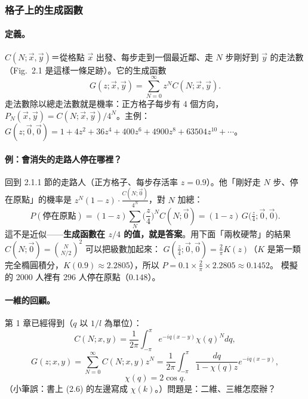 \subsubsection{格子上的生成函數}

\paragraph{定義。}
$C(N;\vec x,\vec y)$＝從格點 $\vec x$ 出發、每步走到一個最近鄰、走 $N$ 步剛好到 $\vec y$ 的走法數（Fig.~2.1 是這樣一條足跡）。它的生成函數
\[G(z;\vec x,\vec y)=\sum_{N=0}^{\infty}z^NC(N;\vec x,\vec y).\tag{2.3}\]
走法數除以總走法數就是機率：正方格子每步有 4 個方向，$P_N(\vec x,\vec y)=C(N;\vec x,\vec y)/4^N$。主例：
$G(z;\vec0,\vec0)=1+4z^2+36z^4+400z^6+4900z^8+63504z^{10}+\cdots$。

\paragraph{例：會消失的走路人停在哪裡？}
回到 2.1.1 節的走路人（正方格子、每步存活率 $z=0.9$）。他「剛好走 $N$ 步、停在原點」的機率是 $z^N(1-z)\cdot\frac{C(N;\vec0)}{4^N}$，對 $N$ 加總：
\[P(\text{停在原點})=(1-z)\sum_N\Big(\frac z4\Big)^NC(N;\vec0)=(1-z)\,G\big(\tfrac z4;\vec0,\vec0\big).\]
這不是近似——\textbf{生成函數在 $z/4$ 的值，就是答案}。用下面「兩枚硬幣」的結果 $C(N;\vec0)=\binom{N}{N/2}^2$ 可以把級數加起來：
$G(\frac z4;\vec0,\vec0)=\frac2\pi K(z)$（$K$ 是第一類完全橢圓積分，$K(0.9)\approx2.2805$），所以 $P=0.1\times\frac2\pi\times2.2805\approx0.1452$。
模擬的 2000 人裡有 296 人停在原點（$0.148$）。

\paragraph{一維的回顧。}
第 1 章已經得到（$q$ 以 $1/l$ 為單位）：
\[C(N;x,y)=\frac1{2\pi}\int_{-\pi}^{\pi}e^{-iq(x-y)}\chi(q)^Ndq,\tag{2.4}\]
\[G(z;x,y)=\sum_{N=0}^\infty C(N;x,y)z^N=\frac1{2\pi}\int_{-\pi}^{\pi}\frac{dq}{1-\chi(q)z}e^{-iq(x-y)},\tag{2.5}\]
\[\chi(q)=2\cos q.\tag{2.6}\]
（小筆誤：書上 (2.6) 的左邊寫成 $\chi(k)$。）問題是：二維、三維怎麼辦？

